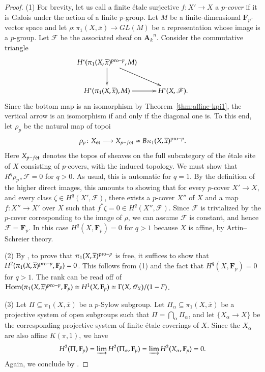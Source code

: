 \documentclass[twoside]{amsart}
\renewcommand{\AA}{\mathbf{A}}
\newcommand{\FF}{\mathbf{F}}
\newcommand{\Ff}{\mathscr{F}}
\newcommand{\Oo}{\mathscr{O}}
\newcommand{\et}{{\rm\acute{e}t}}
\DeclareMathOperator{\Hom}{Hom}
\newcommand{\ANK}[2]{{\AA_{#2}}^{\! \! \! \!  #1}} %
\newcommand{\AN}[1]{\ANK{#1}{k}}
\newcommand{\isom}{\simeq}
\renewcommand{\to}{\longrightarrow}
\renewcommand{\bar}{\overline}
\theoremstyle{plain}
\theoremstyle{definition}
\theoremstyle{remark}
\numberwithin{equation}{subsection}
\begin{document}
\begin{proof}
(1) For brevity, let us call a finite \'etale surjective $f\colon X'\to X$ a \emph{$p$-cover} if it is Galois under the action of a finite $p$-group. Let $M$ be a finite-dimensional $\FF_p$-vector space and let $\rho\colon \pi_1(X, \bar x)\to GL(M)$ be a representation whose image is a $p$-group. Let $\Ff$ be the associated sheaf on $\AN n$. Consider the commutative triangle
\[ 
	\xymatrix{
		H^*(\pi_1(X, \bar x)^{{\rm pro}-p}, M) \ar[dr] \ar[d]  & \\
		H^*(\pi_1(X, \bar x), M) \ar[r] & H^*(X, \Ff). \\
	}
\]
Since the bottom map is an isomorphism by Theorem~\ref{thm:affine-kpi1}, the vertical arrow is an isomorphism if and only if the diagonal one is. To this end, let $\rho_p$ be the natural map of topoi
\[ 
	\rho_p \colon X_\et \to X_{p-f\et} \isom B\pi_1(X, \bar x)^{{\rm pro}-p}.
\]
Here $X_{p-f\et}$ denotes the topos of sheaves on the full subcategory of the \'etale site of $X$ consisting of $p$-covers, with the induced topology. We must show that $R^q \rho_{p*} \Ff = 0$ for $q>0$. As usual, this is automatic for $q=1$. By the definition of the higher direct images, this amounts to showing that for every $p$-cover $X'\to X$, and every class $\zeta \in H^q(X', \Ff)$, there exists a $p$-cover $X''$ of $X$ and a map $f\colon X''\to X'$ over $X$ such that $f^*\zeta = 0 \in H^q(X'', \Ff)$. Since $\Ff$ is trivialized by the $p$-cover corresponding to the image of $\rho$, we can assume $\Ff$ is constant, and hence $\Ff=\FF_p$. In this case $H^q(X, \FF_p) = 0$ for $q>1$ because $X$ is affine, by Artin--Schreier theory. 

(2) By \cite[Theorem~7.7.4]{RibesZaleskii}, to prove that $\pi_1(X, \bar x)^{{\rm pro}-p}$ is free, it suffices to show that $H^2(\pi_1(X, \bar x)^{{\rm pro}-p},\FF_p) = 0$. This follows from (1) and the fact that $H^q(X, \FF_p) = 0$ for $q>1$. The rank can be read off of $\Hom(\pi_1(X, \bar x)^{{\rm pro}-p}, \FF_p) \isom H^1(X, \FF_p) \isom \Gamma(X, \Oo_X)/(1-F)$.

(3) Let $\Pi\subseteq \pi_1(X, \bar x)$ be a $p$-Sylow subgroup. Let $\Pi_\alpha\subseteq \pi_1(X, \bar x)$ be a projective system of open subgroups such that $\Pi = \bigcap_\alpha \Pi_\alpha$, and let $\{X_\alpha\to X\}$ be the corresponding  projective system of finite \'etale coverings of $X$. Since the $X_\alpha$ are also affine $K(\pi, 1)$, we have 
\[ H^2(\Pi, \FF_p) = \varinjlim H^2(\Pi_\alpha, \FF_p) = \varinjlim H^2(X_\alpha, \FF_p) = 0.  \]
Again, we conclude by \cite[Theorem~7.7.4]{RibesZaleskii}.
\end{proof}
\end{document}
